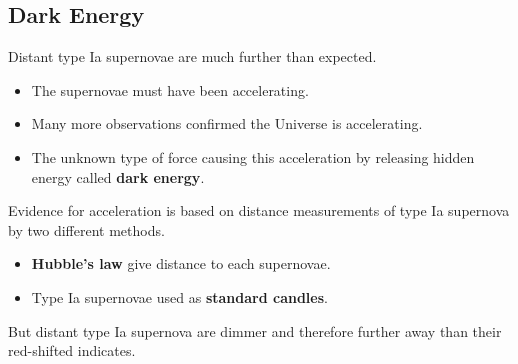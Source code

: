 \subsection*{Dark Energy}

Distant type Ia supernovae are much further than expected.
\begin{itemize}
    \item The supernovae must have been accelerating.
    \item Many more observations confirmed the Universe is accelerating.
    \item The unknown type of force causing this acceleration by releasing hidden energy called \textbf{dark energy}.
\end{itemize}

Evidence for acceleration is based on distance measurements of type Ia supernova by two different methods.
\begin{itemize}
    \item \textbf{Hubble's law} give distance to each supernovae.
    \item Type Ia supernovae used as \textbf{standard candles}.
\end{itemize}

But distant type Ia supernova are dimmer and therefore further away than their red-shifted indicates.
